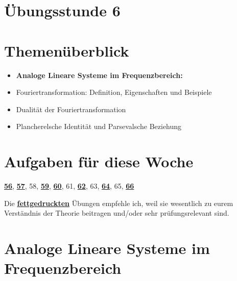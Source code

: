 \documentclass[11pt]{article}
\begin{document}
\thispagestyle{firstpage}

\setlength{\headheight}{1 \baselineskip}  %
\setlength{\parindent}{0pt}  %
\setlength{\parskip}{\baselineskip}  %

\vspace*{-5px}
\section*{Übungsstunde 6}

\section*{Themenüberblick}
\begin{itemize} 
    \item \textbf{Analoge Lineare Systeme im Frequenzbereich:}
    \item[] Fouriertransformation: Definition, Eigenschaften und Beispiele
    \item[] Dualität der Fouriertransformation
    \item[] Plancherelsche Identität und Parsevalsche Beziehung
\end{itemize}

\section*{Aufgaben für diese Woche}
\vspace{-0.5cm}

\underline{\textbf{56}}, \underline{\textbf{57}}, 58, \underline{\textbf{59}}, \underline{\textbf{60}}, 61, \underline{\textbf{62}}, 63, \underline{\textbf{64}}, 65, \underline{\textbf{66}}\\
\vspace{-0.5cm}

Die \underline{\textbf{fettgedruckten}} Übungen empfehle ich, weil sie wesentlich zu eurem Verständnis der Theorie beitragen und/oder sehr prüfungsrelevant sind.

\vfill \null
\pagebreak

\section*{Analoge Lineare Systeme im Frequenzbereich}
\vspace*{-0.5cm}
\end{document}
